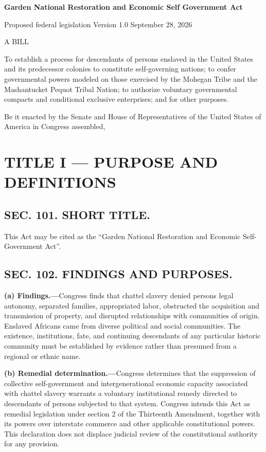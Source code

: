 \documentclass[12pt,letterpaper]{article}
\begin{document}
\begin{center}\Large\bfseries Garden National Restoration and Economic Self Government Act\end{center}

Proposed federal legislation \textbullet{} Version 1.0 \textbullet{} September 28, 2026

A BILL

To establish a process for descendants of persons enslaved in the United States and its predecessor colonies to constitute self-governing nations; to confer governmental powers modeled on those exercised by the Mohegan Tribe and the Mashantucket Pequot Tribal Nation; to authorize voluntary governmental compacts and conditional exclusive enterprises; and for other purposes.

Be it enacted by the Senate and House of Representatives of the United States of America in Congress assembled,

\section*{TITLE I --- PURPOSE AND DEFINITIONS}

\subsection*{SEC. 101. SHORT TITLE.}

This Act may be cited as the ``Garden National Restoration and Economic Self-Government Act''.

\subsection*{SEC. 102. FINDINGS AND PURPOSES.}

\textbf{(a) Findings.---}Congress finds that chattel slavery denied persons legal autonomy, separated families, appropriated labor, obstructed the acquisition and transmission of property, and disrupted relationships with communities of origin. Enslaved Africans came from diverse political and social communities. The existence, institutions, fate, and continuing descendants of any particular historic community must be established by evidence rather than presumed from a regional or ethnic name.

\textbf{(b) Remedial determination.---}Congress determines that the suppression of collective self-government and intergenerational economic capacity associated with chattel slavery warrants a voluntary institutional remedy directed to descendants of persons subjected to that system. Congress intends this Act as remedial legislation under section 2 of the Thirteenth Amendment, together with its powers over interstate commerce and other applicable constitutional powers. This declaration does not displace judicial review of the constitutional authority for any provision.
\end{document}
